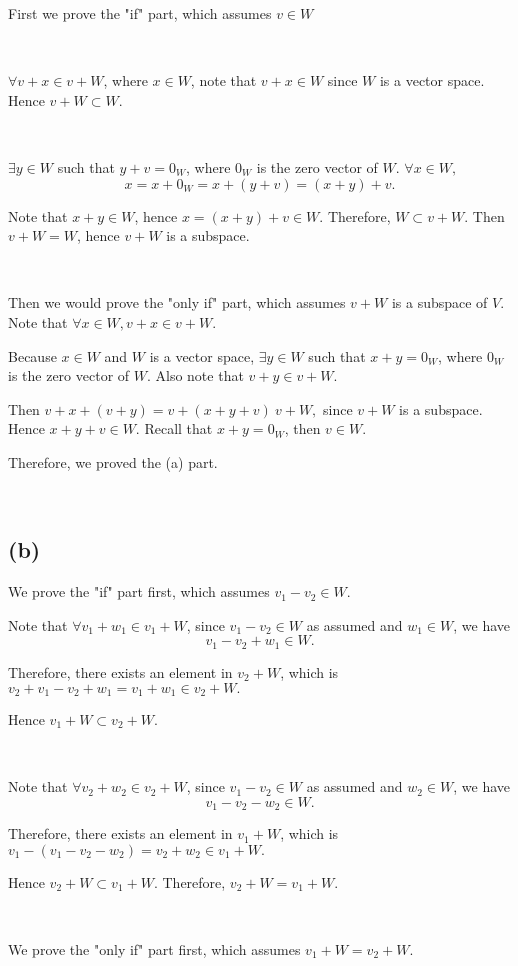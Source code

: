 \documentclass[12pt]{article}%
\begin{document}
First we prove the "if" part, which assumes $v \in W$

~\ 

$\forall v+x \in v+W$, where $x \in W$, note that $v+x \in W$ since $W$ is a vector space. Hence $v+W \subset W.$

~\ 

$\exists y \in W$ such that $y+v=0_W$, where $0_W$ is the zero vector of $W$. 
$\forall x \in W,$ $$x=x+0_W=x+(y+v)=(x+y)+v.$$ 

Note that $x+y\in W$, hence $x=(x+y)+v \in W.$ Therefore, $W \subset v+W.$ Then $v+W=W$, hence $v+W$ is a subspace.

~\ 

Then we would prove the "only if" part, which assumes $v+W$ is a subspace of $V$. Note that $\forall x \in W, v+x \in v+W.$

Because  $x\in W$ and $W$ is a vector space, $\exists y \in W$ such that $x+y=0_W$, where $0_W$ is the zero vector of $W$. Also note that $v+y \in v+W.$

Then $v+x+(v+y)=v+(x+y+v) \ v+W,$ since $v+W$ is a subspace. Hence $x+y+v \in W.$ Recall that $x+y=0_W$, then $v \in W.$

Therefore, we proved the (a) part. 

~\ 

\subsection{(b)} 

We prove the "if" part first, which assumes $v_1-v_2 \in W$.

Note that $\forall v_1+w_1 \in v_1+W$, since $v_1-v_2 \in W$ as assumed and $w_1 \in W$, we have $$v_1-v_2+w_1 \in W.$$

Therefore, there exists an element in $v_2+W$, which is $v_2+v_1-v_2+w_1=v_1+w_1\in v_2+W.$ 

Hence $v_1+W \subset v_2+W.$

~\ 

Note that $\forall v_2+w_2 \in v_2+W$, since $v_1-v_2 \in W$ as assumed and $w_2 \in W$, we have $$v_1-v_2-w_2 \in W.$$

Therefore, there exists an element in $v_1+W$, which is $v_1-(v_1-v_2-w_2)=v_2+w_2\in v_1+W.$ 

Hence $v_2+W \subset v_1+W.$ Therefore, $v_2+W = v_1+W.$

~\ 

We prove the "only if" part first, which assumes $v_1+W = v_2+W$.
\end{document}
